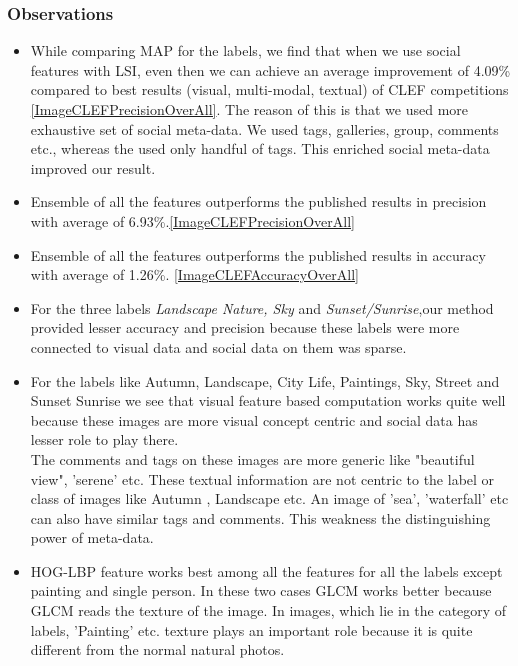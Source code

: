\subsubsection*{Observations}

\begin{itemize}
\item While comparing MAP for the labels, we find that when we use social features with LSI, even then we can achieve an average
improvement of 4.09\% compared to best results (visual, multi-modal, textual) of CLEF competitions \ref{ImageCLEFPrecisionOverAll}. The reason of this is that we used more exhaustive set of social meta-data. We used tags, galleries, group, comments etc., whereas the \citet*{CLEF} used only handful of tags. This enriched social meta-data improved our result.
\item Ensemble of all the features outperforms the published results in precision with average of 6.93\%.\ref{ImageCLEFPrecisionOverAll}
\item Ensemble of all the features outperforms the published results in accuracy with average of 1.26\%. \ref{ImageCLEFAccuracyOverAll}
\item For the three labels \textit{Landscape Nature, Sky} and \textit{Sunset/Sunrise},our method provided lesser accuracy and
precision because these labels were more connected to visual data and social data on them was sparse.
\item For the labels like Autumn, Landscape,  City Life, Paintings, Sky, Street and Sunset Sunrise we see that visual feature based computation works quite well because these images are more visual concept centric and social data has lesser role to play there.\\
The comments and tags on these images are more generic like "beautiful view", 'serene' etc. These textual information are not centric to the label or class of images like Autumn , Landscape etc. An image of 'sea', 'waterfall' etc can also have similar tags and comments. This weakness the distinguishing power of meta-data.
\item HOG-LBP feature works best among all the features for all the labels except painting and single person. In these two cases GLCM
works better because GLCM reads the texture of the image. In images, which lie in the category of labels, 'Painting' etc. texture plays an important role because it is quite different from the normal natural photos.
\end{itemize}
